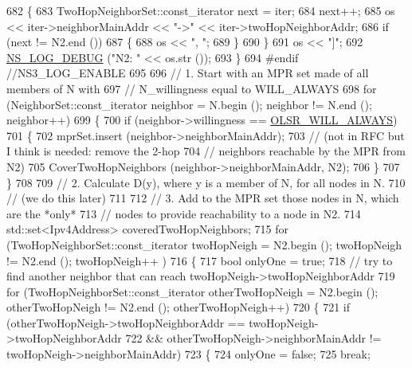 \begin{DoxyCode}
682       \{
683         TwoHopNeighborSet::const\_iterator next = iter;
684         next++;
685         os << iter->neighborMainAddr << \textcolor{stringliteral}{"->"} << iter->twoHopNeighborAddr;
686         \textcolor{keywordflow}{if} (next != N2.end ())
687           \{
688             os << \textcolor{stringliteral}{", "};
689           \}
690       \}
691     os << \textcolor{stringliteral}{"]"};
692     \hyperlink{group__logging_ga413f1886406d49f59a6a0a89b77b4d0a}{NS\_LOG\_DEBUG} (\textcolor{stringliteral}{"N2: "} << os.str ());
693   \}
694 \textcolor{preprocessor}{#endif  //NS3\_LOG\_ENABLE}
695 
696   \textcolor{comment}{// 1. Start with an MPR set made of all members of N with}
697   \textcolor{comment}{// N\_willingness equal to WILL\_ALWAYS}
698   \textcolor{keywordflow}{for} (NeighborSet::const\_iterator neighbor = N.begin (); neighbor != N.end (); neighbor++)
699     \{
700       \textcolor{keywordflow}{if} (neighbor->willingness == \hyperlink{olsr-routing-protocol_8cc_a47254d140ed26351d672c338a8cda435}{OLSR\_WILL\_ALWAYS})
701         \{
702           mprSet.insert (neighbor->neighborMainAddr);
703           \textcolor{comment}{// (not in RFC but I think is needed: remove the 2-hop}
704           \textcolor{comment}{// neighbors reachable by the MPR from N2)}
705           CoverTwoHopNeighbors (neighbor->neighborMainAddr, N2);
706         \}
707     \}
708 
709   \textcolor{comment}{// 2. Calculate D(y), where y is a member of N, for all nodes in N.}
710   \textcolor{comment}{// (we do this later)}
711 
712   \textcolor{comment}{// 3. Add to the MPR set those nodes in N, which are the *only*}
713   \textcolor{comment}{// nodes to provide reachability to a node in N2.}
714   std::set<Ipv4Address> coveredTwoHopNeighbors;
715   \textcolor{keywordflow}{for} (TwoHopNeighborSet::const\_iterator twoHopNeigh = N2.begin (); twoHopNeigh != N2.end (); twoHopNeigh++
      )
716     \{
717       \textcolor{keywordtype}{bool} onlyOne = \textcolor{keyword}{true};
718       \textcolor{comment}{// try to find another neighbor that can reach twoHopNeigh->twoHopNeighborAddr}
719       \textcolor{keywordflow}{for} (TwoHopNeighborSet::const\_iterator otherTwoHopNeigh = N2.begin (); otherTwoHopNeigh != N2.end ();
       otherTwoHopNeigh++)
720         \{
721           \textcolor{keywordflow}{if} (otherTwoHopNeigh->twoHopNeighborAddr == twoHopNeigh->twoHopNeighborAddr
722               && otherTwoHopNeigh->neighborMainAddr != twoHopNeigh->neighborMainAddr)
723             \{
724               onlyOne = \textcolor{keyword}{false};
725               \textcolor{keywordflow}{break};

\end{DoxyCode}
